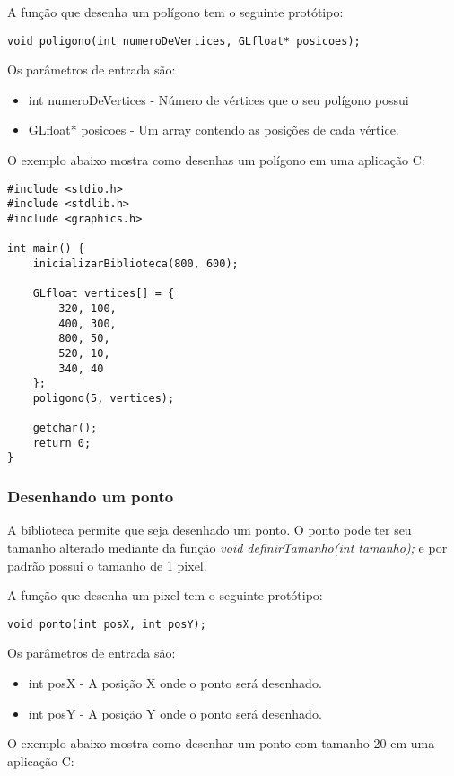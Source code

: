 \documentclass[12pt, %
openright,
oneside, %
a4paper,    %
brazil]{facom-ufu-abntex2}
\begin{document}
A função que desenha um polígono tem o seguinte protótipo:

\begin{lstlisting}
void poligono(int numeroDeVertices, GLfloat* posicoes);
\end{lstlisting}

Os parâmetros de entrada são:

\begin{itemize}
    \item int numeroDeVertices - Número de vértices que o seu polígono possui
    \item GLfloat* posicoes - Um array contendo as posições de cada vértice.
\end{itemize}

O exemplo abaixo mostra como desenhas um polígono em uma aplicação C:

\begin{lstlisting}
#include <stdio.h>
#include <stdlib.h>
#include <graphics.h>

int main() {
    inicializarBiblioteca(800, 600);

    GLfloat vertices[] = {
        320, 100,
        400, 300,
        800, 50,
        520, 10,
        340, 40
    };
    poligono(5, vertices);

    getchar();
    return 0;
}
\end{lstlisting}

\subsubsection{Desenhando um ponto}
A biblioteca permite que seja desenhado um ponto. O ponto pode ter seu tamanho alterado mediante da função \textit{void definirTamanho(int tamanho);} e por padrão possui o tamanho de 1 pixel.

A função que desenha um pixel tem o seguinte protótipo:

\begin{lstlisting}
void ponto(int posX, int posY);
\end{lstlisting}

Os parâmetros de entrada são:

\begin{itemize}
    \item int posX - A posição X onde o ponto será desenhado.
    \item int posY - A posição Y onde o ponto será desenhado.
\end{itemize}

O exemplo abaixo mostra como desenhar um ponto com tamanho 20 em uma aplicação C:
\end{document}
